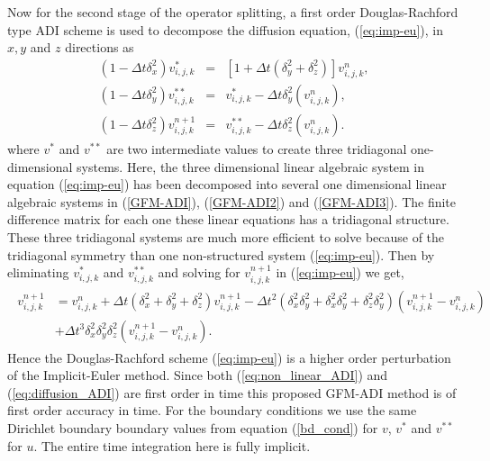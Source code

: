 Now for the second stage of the operator splitting, a first order Douglas-Rachford type ADI scheme is used to decompose the diffusion equation, (\ref{eq:imp-eu}), in $x,y$ and $z$ directions as  
\begin{eqnarray}
		\left(1- \Delta t \delta_x^2\right)v_{i,j,k}^{*}&=&\left[1+ \Delta t \left(\delta_y^2+\delta_z^2 \right)\right]v_{i,j,k}^{n},\label{GFM-ADI}\\
		\left(1-\Delta t \delta_y^2\right)v_{i,j,k}^{**}&=&v_{i,j,k}^{*}- \Delta t \delta_y^2\left(v_{i,j,k}^{n}\right),\label{GFM-ADI2}\\
		\left(1- \Delta t \delta_z^2\right)v_{i,j,k}^{n+1}&=&v_{i,j,k}^{**}- \Delta t \delta_z^2\left(v_{i,j,k}^{n}\right).\label{GFM-ADI3}
\end{eqnarray} 
where $v^*$ and $v^{**}$ are two intermediate values to create three tridiagonal one-dimensional systems. Here, the three dimensional linear algebraic system in equation (\ref{eq:imp-eu}) has been decomposed into several one dimensional linear algebraic systems in (\ref{GFM-ADI}), (\ref{GFM-ADI2}) and (\ref{GFM-ADI3}). The finite difference matrix for each one these linear equations has a tridiagonal structure. These three tridiagonal systems are much more efficient to solve because of the tridiagonal symmetry than one non-structured system (\ref{eq:imp-eu}). Then by eliminating $v^*_{i,j,k}$ and $v^{**}_{i,j,k}$ and solving for $v^{n+1}_{i,j,k}$ in (\ref{eq:imp-eu}) we get,
\begin{eqnarray}
\begin{aligned}
	v^{n+1}_{i,j,k}&=v^n_{i,j,k}+ \Delta t \left(\delta_x^2+\delta_y^2+\delta_z^2\right) v^{n+1}_{i,j,k} -\Delta t^2 \left(\delta_x^2\delta_y^2+\delta_x^2\delta_y^2+\delta_z^2\delta_y^2\right)(v^{n+1}_{i,j,k}-v^{n}_{i,j,k})\\
	&+ \Delta t^3 \delta_x^2\delta_y^2\delta_z^2(v^{n+1}_{i,j,k}-v^{n}_{i,j,k}). \label{adi_tailor}
	\end{aligned}
\end{eqnarray}
Hence the Douglas-Rachford scheme (\ref{eq:imp-eu}) is a higher order perturbation of the Implicit-Euler method. Since both (\ref{eq:non_linear_ADI}) and (\ref{eq:diffusion_ADI}) are first order in time this proposed GFM-ADI method is of first order accuracy in time. For the boundary conditions we use the same Dirichlet boundary boundary values from equation (\ref{bd_cond}) for $v$, $v^*$ and  $v^{**}$ for $u$. The entire time integration here is fully implicit. 


